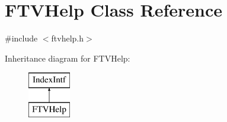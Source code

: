 \hypertarget{class_f_t_v_help}{}\section{F\+T\+V\+Help Class Reference}
\label{class_f_t_v_help}


{\ttfamily \#include $<$ftvhelp.\+h$>$}

Inheritance diagram for F\+T\+V\+Help\+:\begin{figure}[H]
\begin{center}
\leavevmode
\includegraphics[height=2.000000cm]{class_f_t_v_help}
\end{center}
\end{figure}
